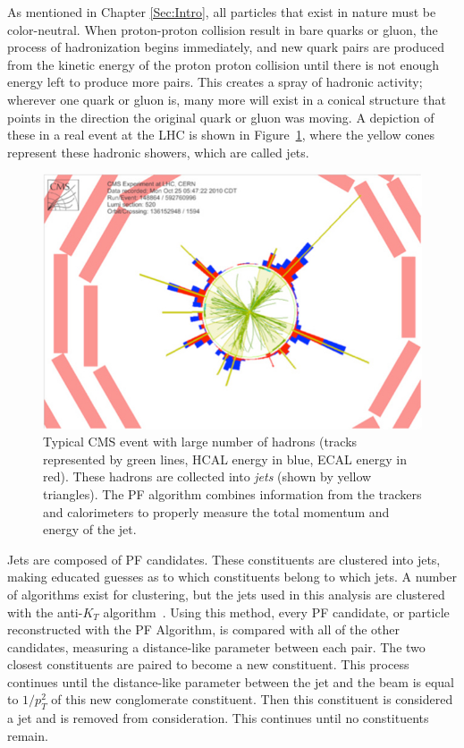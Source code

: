 As mentioned in Chapter \ref{Sec:Intro}, all particles that exist in nature must be color-neutral. When proton-proton collision result in bare quarks or gluon, the process of hadronization begins immediately, and new quark pairs are produced from the kinetic energy of the proton proton collision until there is not enough energy left to produce more pairs. This creates a spray of hadronic activity; wherever one quark or gluon is, many more will exist in a conical structure that points in the direction the original quark or gluon was moving. A depiction of these in a real event at the LHC is shown in Figure~\ref{Fig:CMS:Jet}, where the yellow cones represent these hadronic showers, which are called jets.
\begin{figure}[h!]
    \centering
        \includegraphics[width=\textwidth]{F3/Jets}
        \caption{Typical CMS event with large number of hadrons (tracks represented by green lines, HCAL energy in blue, ECAL energy in red). These hadrons are collected into \textit{jets} (shown by yellow triangles). The PF algorithm combines information from the trackers and calorimeters to properly measure the total momentum and energy of the jet.}
        \label{Fig:CMS:Jet}
\end{figure}
Jets are composed of PF candidates. These constituents are clustered into jets, making educated guesses as to which constituents belong to which jets. A number of algorithms exist for clustering, but the jets used in this analysis are clustered with the anti-$K_{T}$ algorithm~\cite{Cacciari:2008gp}. Using this method, every PF candidate, or particle reconstructed with the PF Algorithm, is compared with all of the other candidates, measuring a distance-like parameter between each pair. The two closest constituents are paired to become a new constituent. This process continues until the distance-like parameter between the jet and the beam is equal to $1/p_T^2$ of this new conglomerate constituent. Then this constituent is considered a jet and is removed from consideration. This continues until no constituents remain.

